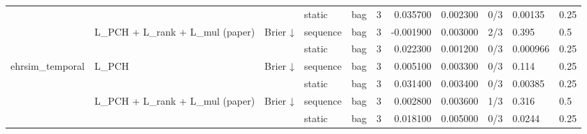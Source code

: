 \begin{tabular}{lllllrrrlll}
 &  &  & static & bag & 3 & 0.035700 & 0.002300 & 0/3 & 0.00135 & 0.25 \\
\cline{2-11} \cline{3-11}
 & \multirow[t]{2}{*}{L\_PCH + L\_rank + L\_mul (paper)} & \multirow[t]{2}{*}{Brier ↓} & sequence & bag & 3 & -0.001900 & 0.003000 & 2/3 & 0.395 & 0.5 \\
 &  &  & static & bag & 3 & 0.022300 & 0.001200 & 0/3 & 0.000966 & 0.25 \\
\cline{1-11} \cline{2-11} \cline{3-11}
\multirow[t]{4}{*}{ehrsim\_temporal} & \multirow[t]{2}{*}{L\_PCH} & \multirow[t]{2}{*}{Brier ↓} & sequence & bag & 3 & 0.005100 & 0.003300 & 0/3 & 0.114 & 0.25 \\
 &  &  & static & bag & 3 & 0.031400 & 0.003400 & 0/3 & 0.00385 & 0.25 \\
\cline{2-11} \cline{3-11}
 & \multirow[t]{2}{*}{L\_PCH + L\_rank + L\_mul (paper)} & \multirow[t]{2}{*}{Brier ↓} & sequence & bag & 3 & 0.002800 & 0.003600 & 1/3 & 0.316 & 0.5 \\
 &  &  & static & bag & 3 & 0.018100 & 0.005000 & 0/3 & 0.0244 & 0.25 \\
\cline{1-11} \cline{2-11} \cline{3-11}
\bottomrule
\end{tabular}
